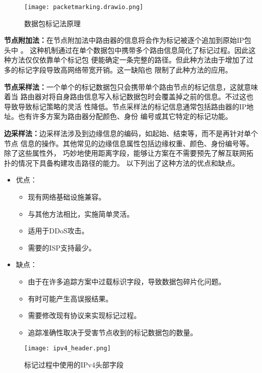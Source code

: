 \begin{figure}[htbp]
  \centering
  \texttt{[image: packetmarking.drawio.png]}
  \caption{数据包标记法原理}
  \label{fig:packet_marking}
\end{figure}

\textbf{节点附加法：}在节点附加法中路由器的信息将会作为标记被逐个追加到原始IP包头中
\cite{Amin2006,Min2003}。
这种机制通过在单个数据包中携带多个路由信息简化了标记过程。因此这种方法仅仅依靠单个标记包
便能确定一条完整的路径。但此种方法由于增加了过多的标记字段导致高网络带宽开销。这一缺陷也
限制了此种方法的应用。

\textbf{节点采样法：}一个单个的标记数据包只会携带单个路由节点的标记信息，这就意味着当
路由器对将自身路由信息写入标记数据包时会覆盖掉之前的信息。不过这也导致导致标记策略的灵活
性降低。节点采样法的标记信息通常包括路由器的IP地址。也有许多方案为路由器分配颜色、身份
编号或其它特定的标记功能\cite{Jin2009,Liu2006}。

\textbf{边采样法：}边采样法涉及到边缘信息的编码，如起始、结束等，而不是再针对单个节点
信息的操作。其他常见的边缘信息属性包括边缘权重、颜色、身份编号等。除了这些属性外，
巧妙地使用距离字段，能够让方案在不需要预先了解互联网拓扑的情况下具备构建攻击路径的能力。
以下列出了这种方法的优点和缺点。
\begin{itemize}
  \item 优点：
  \begin{itemize}
    \item 现有网络基础设施兼容。
    \item 与其他方法相比，实施简单灵活。
    \item 适用于DDoS攻击。
    \item 需要的ISP支持最少。
  \end{itemize}
  \item 缺点：
  \begin{itemize}
    \item 由于在许多追踪方案中过载标识字段，导致数据包碎片化问题。
    \item 有时可能产生高误报结果。
    \item 需要修改现有协议来实现标记过程。
    \item 追踪准确性取决于受害节点收到的标记数据包的数量。
  \end{itemize}
\end{itemize}




\begin{figure}[htbp]
  \centering
  \texttt{[image: ipv4\_header.png]}
  \caption{标记过程中使用的IPv4头部字段}
  \label{fig:ipv4_header}
\end{figure}


